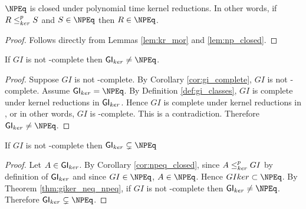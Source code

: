 \begin{corollary}\label{cor:npeq_closed}$\NPEq$ is closed under polynomial time
  kernel reductions. In other words, if $R\leq^{p}_{ker} S$ and $S\in\NPEq$ then
  $R\in\NPEq$.\end{corollary}
\begin{proof}Follows directly from Lemmas \ref{lem:kr_mor} and
  \ref{lem:np_closed}.\end{proof}

\begin{theorem}\label{thm:giker_neq_npeq}If $GI$ is not \NP-complete then
  $\GIker\neq\NPEq$.\end{theorem}
\begin{proof}
  Suppose $GI$ is not \NP-complete. By Corollary \ref{cor:gi_complete}, $GI$ is
  not \NPEq-complete. Assume $\GIker=\NPEq$. By Definition
  \ref{def:gi_classes}, $GI$ is complete under kernel reductions in
  ${\mathsf{GI}}_{ker}$. Hence $GI$ is complete under kernel reductions in \NPEq, or in
  other words, $GI$ is \NPEq-complete. This is a contradiction. Therefore
  $\GIker\neq\NPEq$.
\end{proof}

\begin{theorem}If $GI$ is not \NP-complete then
  $\GIker\subsetneq\NPEq$\end{theorem}
\begin{proof}Let $A\in{\ensuremath{\mathsf{GI}}}_{ker}$. By Corollary \ref{cor:npeq_closed}, since $A\leq^{p}_{ker}
  GI$ by definition of ${\mathsf{GI}}_{ker}$ and since $GI\in\NPEq$, $A\in\NPEq$. Hence
  $GIker\subset\NPEq$. By Theorem \ref{thm:giker_neq_npeq}, if $GI$ is not
  \NP-complete then $\GIker\neq\NPEq$. Therefore
  $\GIker\subsetneq\NPEq$.\end{proof}
